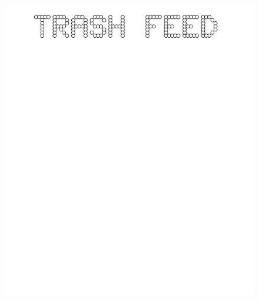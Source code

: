\documentclass[17pt]{extreport}
\begin{document}
	\begin{figure}
		\centering
		\includegraphics[width=6.25in]{imageserver/uploadimages/trashfeed.png}
	\end{figure}
	
\end{document}
